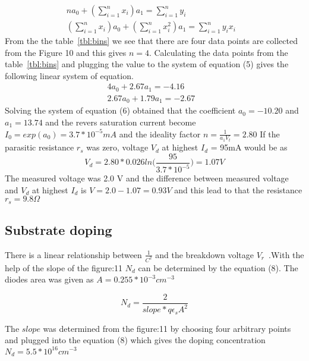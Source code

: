 \documentclass[letterpaper,12pt]{article}
\begin{document}
\begin{equation}
\begin{aligned}
na_0 + (\sum\limits_{i=1}^n x_i)a_1 = \sum\limits_{i=1}^n y_i & \\
(\sum\limits_{i=1}^n x_i)a_0 + (\sum\limits_{i=1}^n x_i^2)a_1 = \sum\limits_{i=1}^n y_ix_i
\end{aligned}
\end{equation}
From the the table~\ref{tbl:bins} we see that there are four data points are 
collected from the Figure 10 and this gives $n = 4$. Calculating the data points from the table~\ref{tbl:bins} and plugging the value to the system of equation (5) gives the following linear system of equation.
\begin{equation}
\begin{aligned}
    4a_0 + 2.67a_1 = -4.16 &  \\
    2.67a_0 + 1.79a_1 = -2.67 & 
\end{aligned}
\end{equation}
Solving the system of equation (6) obtained that the coefficient $ a_0 = -10.20$ and $a_1 = 13.74$
and the revers saturation current become
$I_0 = exp(a_0) = 3.7*10^{-5}  m A $  
and the ideality factor 
$n = \frac{1}{a_1V_t} = 2.80 $ 
\newline 
If the parasitic  resistance $r_s$ was zero, voltage $V_d$ at
highest $I_d$ = 95mA would be as 
\begin{equation}
    V_d = 2.80*0.026ln\Big(\frac{95}{3.7*10^{-5}}\Big) = 1.07 V
\end{equation}
 The measured voltage was 2.0 V and the difference between measured voltage and $V_d$ at highest $I_d$ is   
$V = 2.0-1.07 = 0.93V$ and this lead to that the resistance 
$r_s = 9.8\Omega$


\subsection{Substrate doping}
There is a linear relationship between $\frac{1}{C^2}$ and the breakdown voltage $V_r$~\cite{hu}.With the help of the slope of the figure:11 $N_d$ can be determined by the equation (8).
The diodes area was given as $A = 0.255*10^{-3} cm^{-3}$

\begin{equation}
    N_d = \frac{2}{slope*q\epsilon_sA^2}
\end{equation}

The $slope$ was determined from the figure:11 by choosing four arbitrary points and plugged into the equation (8) which gives the doping concentration 
$N_d = 5.5*10^{16} cm^{-3}$
\end{document}
